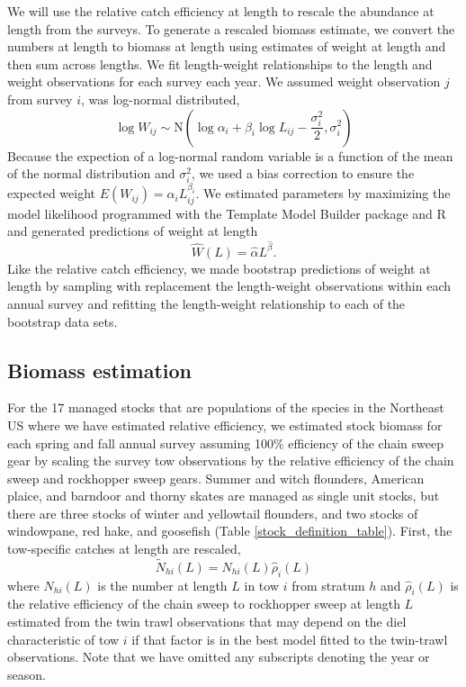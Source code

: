 \documentclass[
  12pt,
]{article}
\begin{document}
We will use the relative catch efficiency at length to rescale the
abundance at length from the surveys. To generate a rescaled biomass
estimate, we convert the numbers at length to biomass at length using
estimates of weight at length and then sum across lengths. We fit
length-weight relationships to the length and weight observations for
each survey each year. We assumed weight observation \(j\) from survey
\(i\), was log-normal distributed, \begin{equation}\label{wal}
 \log W_{ij} \sim \text{N}\left(\log \alpha_i + \beta_i \log L_{ij} - \frac{\sigma_i^2}{2}, \sigma_i^2\right)
\end{equation} Because the expection of a log-normal random variable is
a function of the mean of the normal distribution and \(\sigma_i^2\), we
used a bias correction to ensure the expected weight
\(E(W_{ij})= \alpha_i L_{ij}^{\beta_i}\). We estimated parameters by
maximizing the model likelihood programmed with the Template Model
Builder package and R and generated predictions of weight at length
\begin{equation}\label{predwal}
\widehat W(L) = \widehat \alpha L^{\widehat \beta}.
\end{equation} Like the relative catch efficiency, we made bootstrap
predictions of weight at length by sampling with replacement the
length-weight observations within each annual survey and refitting the
length-weight relationship to each of the bootstrap data sets.

\hypertarget{biomass-estimation}{%
\subsection{Biomass estimation}\label{biomass-estimation}}

For the 17 managed stocks that are populations of the species in the
Northeast US where we have estimated relative efficiency, we estimated
stock biomass for each spring and fall annual survey assuming 100\%
efficiency of the chain sweep gear by scaling the survey tow
observations by the relative efficiency of the chain sweep and
rockhopper sweep gears. Summer and witch flounders, American plaice, and
barndoor and thorny skates are managed as single unit stocks, but there
are three stocks of winter and yellowtail flounders, and two stocks of
windowpane, red hake, and goosefish (Table
\ref{stock_definition_table}). First, the tow-specific catches at length
are rescaled, \begin{equation}\label{nal}
\widetilde N_{hi}\left(L\right) = N_{hi}\left(L\right)\widehat \rho_i\left(L\right)
\end{equation} where \(N_{hi}(L)\) is the number at length \(L\) in tow
\(i\) from stratum \(h\) and \(\widehat \rho_i\left(L\right)\) is the
relative efficiency of the chain sweep to rockhopper sweep at length
\(L\) estimated from the twin trawl observations that may depend on the
diel characteristic of tow \(i\) if that factor is in the best model
fitted to the twin-trawl observations. Note that we have omitted any
subscripts denoting the year or season.
\end{document}

